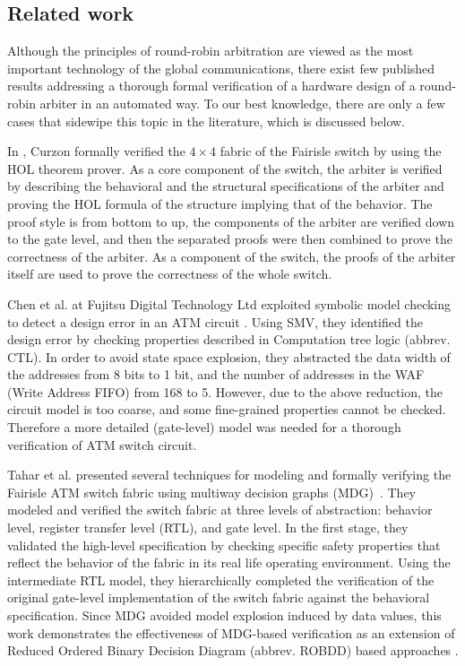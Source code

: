 \documentclass[final]{IEEEtran}
\begin{document}


%

\subsection{Related work}

Although the principles of round-robin arbitration are viewed as the
most important technology of the global communications, there exist
few published results addressing a thorough formal verification of
a hardware design of a round-robin arbiter in an automated way. To
our best knowledge, there are only a few cases that sidewipe this
topic in the literature, which is discussed below.

In \cite{Paul94, PaulTech94}, Curzon formally verified the $4 \times 4$
fabric of the Fairisle switch by using the HOL theorem prover. As
a core component of the switch, the arbiter is verified by
describing the behavioral and the structural specifications of the
arbiter and proving the HOL formula of the structure implying that
of the behavior. The proof style is from bottom to up, the
components of the arbiter are verified down to the gate level, and
then the separated proofs were then combined to prove the
correctness of the arbiter. As a component of the switch, the proofs
of the arbiter itself are used to prove the correctness of the whole
switch.

Chen et al. at Fujitsu Digital Technology Ltd exploited symbolic
model checking to detect a design error in an ATM circuit
\cite{ChenYF94}. Using SMV, they identified the design error by
checking properties described in Computation tree logic (abbrev.
CTL)\cite{Clarke:1986:AVF:5397.5399}. In order to avoid state space
explosion, they abstracted the data width of the addresses from 8
bits to 1 bit, and the number of addresses in the WAF (Write Address
FIFO) from 168 to 5. However, due to the above reduction, the
circuit model is too coarse, and some fine-grained properties cannot
be checked. Therefore a more detailed (gate-level) model was needed
for a thorough verification of ATM switch circuit.

Tahar et al. presented several techniques for modeling and formally
verifying  the Fairisle  ATM switch fabric using multiway decision
graphs (MDG)~\cite{DBLP:journals/tcad/TaharSCZLM99}.  They modeled
and verified the switch fabric at three levels of abstraction:
behavior level, register transfer level (RTL), and gate level. In
the first stage, they validated the high-level specification by
checking specific safety properties that reflect the behavior of the
fabric in its real life operating environment. Using the
intermediate RTL model, they hierarchically completed the
verification of the original gate-level implementation of the switch
fabric against the behavioral specification. Since MDG avoided model
explosion induced by data values, this work demonstrates the
effectiveness of MDG-based verification as an extension of Reduced
Ordered Binary Decision Diagram (abbrev.  ROBDD) based approaches
\cite{Bryant:1986:GAB:6432.6433}.
\end{document}
